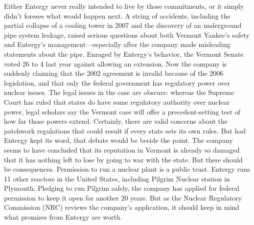 Either Entergy never really intended to live by those commitments, or it simply didn’t foresee what would happen next. A string of accidents, including the partial collapse of a cooling tower in 2007 and the discovery of an underground pipe system leakage, raised serious questions about both Vermont Yankee’s safety and Entergy’s management—especially after the company made misleading  statements about the pipe. Enraged by Entergy’s behavior, the Vermont Senate voted 26 to 4 last year against allowing an extension.
    Now the company is suddenly claiming that the 2002 agreement is invalid because of the 2006 legislation, and that only the federal government has regulatory power over nuclear issues. The legal issues in the case are obscure: whereas the Supreme Court has ruled that states do have some regulatory authority over nuclear power, legal scholars say the Vermont case will offer a precedent-setting test of how far those powers extend. Certainly, there are valid concerns about the patchwork regulations that could result if every state sets its own rules. But had Entergy kept its word, that debate would be beside the point.
    The company seems to have concluded that its reputation in Vermont is already so damaged that it has nothing left to lose by going to war with the state. But there should be consequences. Permission to run a nuclear plant is a public trust. Entergy runs 11 other reactors in the United States, including Pilgrim Nuclear station in Plymouth. Pledging to run Pilgrim safely, the company has applied for federal permission to keep it open for another 20 years. But as the Nuclear Regulatory Commission (NRC) reviews the company’s application, it should keep in mind what promises from Entergy are worth.

